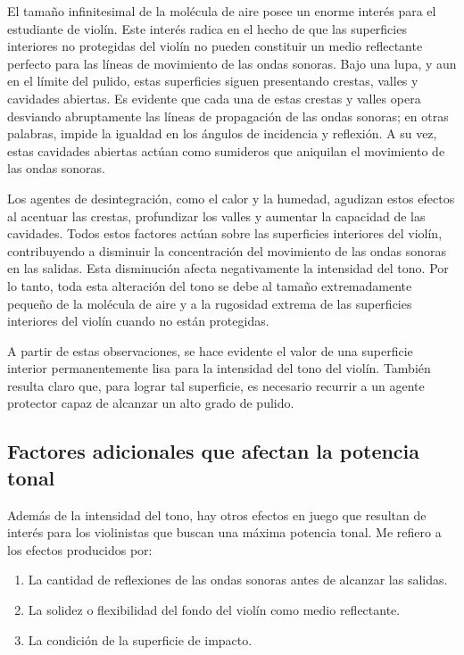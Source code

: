 \documentclass[12pt]{book}
\begin{document}
El tamaño infinitesimal de la molécula de aire posee un enorme interés para el estudiante de violín. Este interés radica en el hecho de que las superficies interiores no protegidas del violín no pueden constituir un medio reflectante perfecto para las líneas de movimiento de las ondas sonoras. Bajo una lupa, y aun en el límite del pulido, estas superficies siguen presentando crestas, valles y cavidades abiertas. Es evidente que cada una de estas crestas y valles opera desviando abruptamente las líneas de propagación de las ondas sonoras; en otras palabras, impide la igualdad en los ángulos de incidencia y reflexión. A su vez, estas cavidades abiertas actúan como sumideros que aniquilan el movimiento de las ondas sonoras. 

Los agentes de desintegración, como el calor y la humedad, agudizan estos efectos al acentuar las crestas, profundizar los valles y aumentar la capacidad de las cavidades. Todos estos factores actúan sobre las superficies interiores del violín, contribuyendo a disminuir la concentración del movimiento de las ondas sonoras en las salidas. Esta disminución afecta negativamente la intensidad del tono. Por lo tanto, toda esta alteración del tono se debe al tamaño extremadamente pequeño de la molécula de aire y a la rugosidad extrema de las superficies interiores del violín cuando no están protegidas.

A partir de estas observaciones, se hace evidente el valor de una superficie interior permanentemente lisa para la intensidad del tono del violín. También resulta claro que, para lograr tal superficie, es necesario recurrir a un agente protector capaz de alcanzar un alto grado de pulido.

\subsection*{Factores adicionales que afectan la potencia tonal}

Además de la intensidad del tono, hay otros efectos en juego que resultan de interés para los violinistas que buscan una máxima potencia tonal. Me refiero a los efectos producidos por:

\begin{enumerate}
    \item La cantidad de reflexiones de las ondas sonoras antes de alcanzar las salidas.
    \item La solidez o flexibilidad del fondo del violín como medio reflectante.
    \item La condición de la superficie de impacto.
\end{enumerate}
\end{document}
